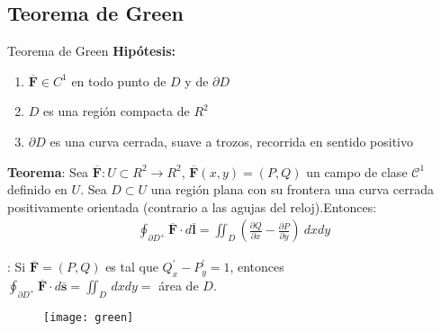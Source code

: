 \documentclass[a4paper, twoside]{article}
\numberwithin{equation}{section}
\numberwithin{figure}{section}
\numberwithin{table}{section}
\newcommand{\vect}[1]{\overline{\textbf{#1}}}
\begin{document}
\subsection{Teorema de Green}
\begin{minipage}{0.75\textwidth}
	\begin{teorema*}[0.9\textwidth]{Teorema de Green}
		\textbf{Hipótesis:}
		\begin{enumerate}
			\item $\vect{F} \in C^1$ en todo punto de $D$ y de $\partial D$
			\item $D$ es una región compacta de $R^2$
			\item $\partial D$ es una curva cerrada, suave a trozos, recorrida en sentido positivo
		\end{enumerate}

		\textbf{Teorema}: Sea $\vect{F}: U \subset R^2 \rightarrow R^2$, $\vect{F}(x,y)=(P,Q)$ un campo de clase $\mathcal{C}^1$ definido en $U$. Sea $D \subset U$ una región plana con su frontera una curva cerrada positivamente orientada (contrario a las agujas del reloj).Entonces:
		\begin{align}
			\oint_{\partial D^{+}} \vect{F} \cdot d\vect{l} = \iint_{D} \left(\frac{\partial Q}{\partial x} - \frac{\partial P}{\partial y} \right)\: dxdy
		\end{align}

		: Si $\vect{F}=(P,Q)$ es tal que $Q^\prime_{x}-P^\prime_{y}=1$, entonces\\
		$\oint_{\partial D^+}\vect{F} \cdot d\vect{s}=\iint_{D}\, dxdy=$ área de $D$.
	\end{teorema*}
\end{minipage}
\begin{minipage}{0.2\textwidth}
	\begin{figure}[H]
		\texttt{[image: green]}
	\end{figure}
\end{minipage}
\end{document}
